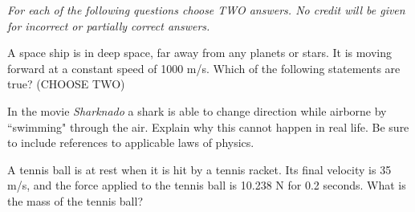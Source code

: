 \documentclass[10pt]{examdesign}
\begin{document}
\pagebreak
\begin{multiplechoice} [title={Multiple Correct Choice},
	rearrange=no]
\textit{For each of the following questions choose TWO answers.  No credit will be given for incorrect or partially correct answers.}
\begin{question}
	A space ship is in deep space, far away from any planets or stars.  It is moving forward at a constant speed of 1000 m/s.  Which of the following statements are true? (CHOOSE TWO)
\end{question}

\end{multiplechoice}

\begin{shortanswer}  [title={Free Response}, rearrange=no]
	\begin{question}
	In the movie \textit{Sharknado}	a shark is able to change direction while airborne by ``swimming" through the air.  Explain why this cannot happen in real life.  Be sure to include references to applicable laws of physics. 
	\vspace {2 in}
	\end{question}

	\begin{question}
	A tennis ball is at rest when it is hit by a tennis racket.  Its final velocity is 35 m/s, and the force applied to the tennis ball is 10.238 N for 0.2 seconds.  What is the mass of the tennis ball?
	\end{question}
	
	\end{shortanswer}
\end{document}
